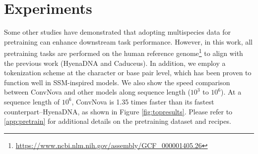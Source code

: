 

\section{Experiments}
\label{experiments}
Some other studies have demonstrated that adopting multispecies data for pretraining can enhance downstream task performance. However, in this work, all pretraining tasks are performed on the human reference genome\footnote{\url{https://www.ncbi.nlm.nih.gov/assembly/GCF_000001405.26}} to align with the previous work (HyenaDNA and Caduceus). In addition, we employ a tokenization scheme at the character or base pair level, which has been proven to function well in SSM-inspired models. We also show the speed comparison between ConvNova and other models along sequence length ($10^3$ to $10^6$). At a sequence length of $10^6$, ConvNova is 1.35 times faster
than its fastest counterpart--HyenaDNA, as shown in Figure  \ref{fig:topresults}. Please refer to \ref{app:pretrain} for additional details on the pretraining dataset and recipes.

